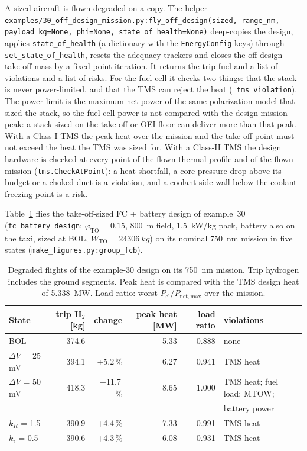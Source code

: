 \documentclass[a4paper,11pt]{article}
\newcommand{\code}[1]{\nolinkurl{#1}}
\newcommand{\fn}[1]{\nolinkurl{#1}}
\newcommand{\Pel}{P_\mathrm{el}}
\begin{document}
A sized aircraft is flown degraded on a copy. The helper
\fn{examples/30_off_design_mission.py:fly_off_design(sized, range_nm, payload_kg=None, phi=None, state_of_health=None)}
deep-copies the design, applies \code{state_of_health} (a dictionary with the
\code{EnergyConfig} keys) through \fn{set_state_of_health}, resets the adequacy trackers and
closes the off-design take-off mass by a fixed-point iteration. It returns the trip fuel and a
list of violations and a list of risks. For the fuel cell it checks two things: that the
stack is never power-limited, and that the TMS can reject the heat (\fn{_tms_violation}). The
power limit is the maximum net power of the same polarization model that sized the stack, so
the fuel-cell power is not compared with the design mission peak: a stack sized on the
take-off or OEI floor can deliver more than that peak. With a Class-I TMS the peak heat over
the mission and the take-off point must not exceed the heat the TMS was sized for. With a
Class-II TMS the design hardware is checked at every point of the flown thermal profile and
of the flown mission (\fn{tms.CheckAtPoint}): a heat shortfall, a core pressure drop above its
budget or a choked duct is a violation, and a coolant-side wall below the coolant freezing
point is a risk.

Table~\ref{tab:degflight} flies the take-off-sized FC + battery design of example~30
(\fn{fc_battery_design}: $\varphi_\mathrm{TO}=0.15$, \SI{800}{m} field, \SI{1.5}{kW/kg} pack, battery
also on the taxi, sized at BOL, $W_\mathrm{TO}=\SI{24306}{kg}$) on its
nominal 750~nm mission in five states (\fn{make_figures.py:group_fcb}).

\begin{table}[ht]
\centering\small
\caption{Degraded flights of the example-30 design on its 750~nm mission. Trip hydrogen
includes the ground segments. Peak heat is compared with the TMS design heat of
\SI{5.338}{MW}. Load ratio: worst $\Pel/P_\mathrm{net,max}$ over the mission.}
\label{tab:degflight}
\setlength{\tabcolsep}{4pt}
\begin{tabular}{@{}lrrrrl@{}}
\toprule
State & trip H$_2$ [kg] & change & peak heat [MW] & load ratio & violations \\
\midrule
BOL & 374.6 & -- & 5.33 & 0.888 & none \\
$\Delta V$ = 25 mV & 394.1 & +5.2\,\% & 6.27 & 0.941 & TMS heat \\
$\Delta V$ = 50 mV & 418.3 & +11.7\,\% & 8.65 & 1.000 & TMS heat; fuel load; MTOW; \\
 & & & & & battery power \\
$k_R$ = 1.5 & 390.9 & +4.4\,\% & 7.33 & 0.991 & TMS heat \\
$k_i$ = 0.5 & 390.6 & +4.3\,\% & 6.08 & 0.931 & TMS heat \\
\bottomrule
\end{tabular}
\end{table}
\end{document}
